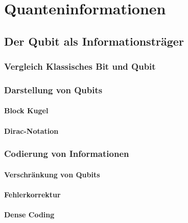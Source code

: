 \chapter{Quanteninformationen}
\label{qbits} %



\section{Der Qubit als Informationsträger}
\subsection{Vergleich Klassisches Bit und Qubit}

\subsection{Darstellung von Qubits}
\subsubsection{Block Kugel}
\subsubsection{Dirac-Notation}
\subsection{Codierung von Informationen}
\subsubsection{Verschränkung von Qubits}
\subsubsection{Fehlerkorrektur}
\subsubsection{Dense Coding}
\\

